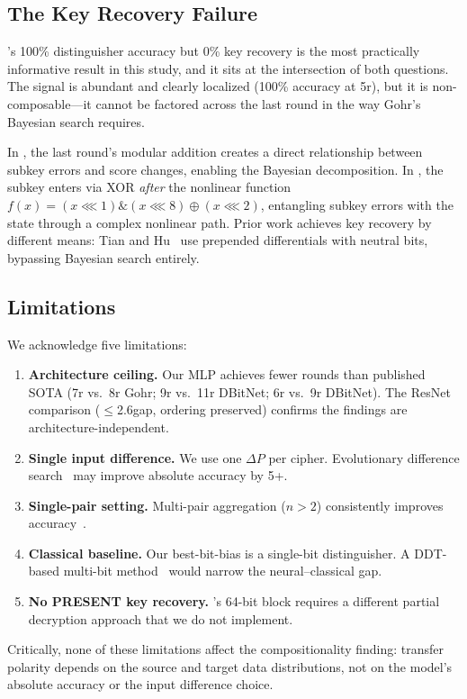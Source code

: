 \FloatBarrier
\subsection{The \simon Key Recovery Failure}

\simon's 100\% distinguisher accuracy but 0\% key recovery is the most practically informative result in this study, and it sits at the intersection of both questions.
The signal is abundant and clearly localized (100\% accuracy at 5r), but it is non-composable---it cannot be factored across the last round in the way Gohr's Bayesian search requires.

In \speck, the last round's modular addition creates a direct relationship between subkey errors and score changes, enabling the Bayesian decomposition.
In \simon, the subkey enters via XOR \emph{after} the nonlinear function $f(x) = (x \lll 1) \mathbin{\&} (x \lll 8) \oplus (x \lll 2)$, entangling subkey errors with the state through a complex nonlinear path.
Prior work achieves \simon key recovery by different means: Tian and Hu~\citep{tian2022simon} use prepended differentials with neutral bits, bypassing Bayesian search entirely.

\FloatBarrier
\subsection{Limitations}

We acknowledge five limitations:

\begin{enumerate}[leftmargin=*,itemsep=1pt]
  \item \textbf{Architecture ceiling.} Our MLP achieves fewer rounds than published SOTA (7r \speck vs.\ 8r Gohr; 9r \simon vs.\ 11r DBitNet; 6r \present vs.\ 9r DBitNet). The ResNet comparison ($\leq$2.6\pp gap, ordering preserved) confirms the findings are architecture-independent.
  \item \textbf{Single input difference.} We use one $\Delta P$ per cipher. Evolutionary difference search~\citep{bellini2023dbitnet} may improve absolute accuracy by 5+\pp.
  \item \textbf{Single-pair setting.} Multi-pair aggregation ($n > 2$) consistently improves accuracy~\citep{zhang2025multipair}.
  \item \textbf{Classical baseline.} Our best-bit-bias is a single-bit distinguisher. A DDT-based multi-bit method~\citep{gohr2022assessment} would narrow the neural--classical gap.
  \item \textbf{No PRESENT key recovery.} \present's 64-bit block requires a different partial decryption approach that we do not implement.
\end{enumerate}

\noindent
Critically, none of these limitations affect the compositionality finding: transfer polarity depends on the source and target data distributions, not on the model's absolute accuracy or the input difference choice.
